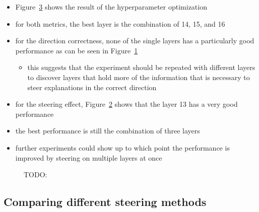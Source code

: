 \begin{itemize}
  \item Figure~\ref{fig:activationSteeringHPO} shows the result of the hyperparameter optimization
  \item for both metrics, the best layer is the combination of \num{14}, \num{15}, and \num{16}
  \item for the direction correctness, none of the single layers has a particularly good performance as can be seen in Figure~\ref{fig:activationSteeringHPO:directionCorrectness}
        \begin{itemize}
          \item this suggests that the experiment should be repeated with different layers to discover layers that hold more of the information that is necessary to steer explanations in the correct direction
        \end{itemize}
  \item for the steering effect, Figure~\ref{fig:activationSteeringHPO:steeringEffect} shows that the layer \num{13} has a very good performance
  \item the best performance is still the combination of three layers
  \item further experiments could show up to which point the performance is improved by steering on multiple layers at once
\end{itemize}

\begin{figure}[ht]
  \begin{subfigure}[c]{0.49\linewidth}
    \label{fig:activationSteeringHPO:directionCorrectness}
  \end{subfigure}
  \hfill
  \begin{subfigure}[c]{0.49\linewidth}
    \label{fig:activationSteeringHPO:steeringEffect}
  \end{subfigure}
  \caption{TODO:}%
  \label{fig:activationSteeringHPO}
\end{figure}


\subsection{Comparing different steering methods}


